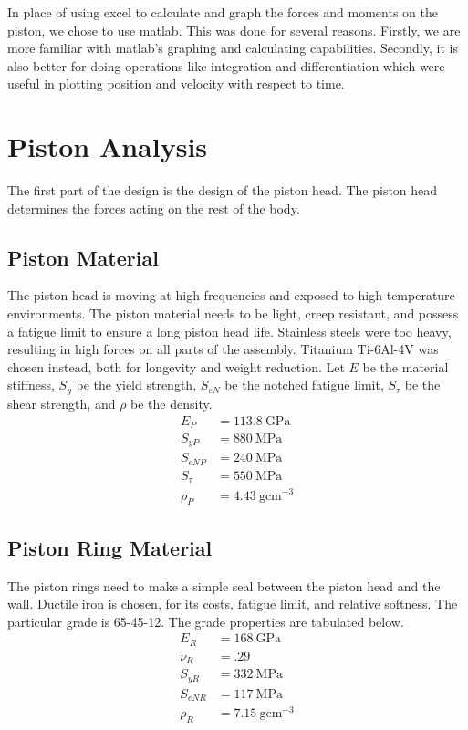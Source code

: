 \documentclass[10pt,a4paper]{article}
\begin{document}
In place of using excel to calculate and graph the forces and moments on the piston, we chose to use matlab. This was done for
several reasons. Firstly, we are more familiar with matlab's graphing and calculating capabilities. Secondly, it is also better for doing
operations like integration and differentiation which were useful in plotting position and velocity with respect to time.

\section*{Piston Analysis}
The first part of the design is the design of the piston head. The piston head determines the forces acting on the rest of the body.
\subsection*{Piston Material}
The piston head is moving at high frequencies and exposed to high-temperature environments. The piston material needs to be light, creep resistant, and possess a fatigue limit to ensure a long piston head life. Stainless steels were too heavy, resulting in high forces on all parts of the assembly. Titanium Ti-6Al-4V was chosen instead, both for longevity and weight reduction. Let $E$ be the material stiffness, $S_y$ be the yield strength, $S_{eN}$ be the notched fatigue limit, $S_{\tau}$ be the shear strength, and $\rho$ be the density. 
\begin{align*}
	E_P &= 113.8\ \text{GPa}\nonumber \\
	S_{y P} &= 880\ \text{MPa}\nonumber \\
	S_{eN P} &= 240\ \text{MPa}\nonumber \\
	S_{\tau} &= 550\ \text{MPa}\nonumber \\
	\rho_P &= 4.43\ \text{g}\text{cm}^{-3}\nonumber 
\end{align*}
\subsection*{Piston Ring Material}
The piston rings need to make a simple seal between the piston head and the wall. Ductile iron is chosen, for its costs, fatigue limit, and relative softness. The particular grade is 65-45-12. The grade properties are tabulated below.
\begin{align*}
	E_R &= 168\ \text{GPa}\nonumber \\
	\nu_R &= .29\nonumber \\
	S_{y R} &= 332\ \text{MPa}\nonumber \\
	S_{eN R}&= 117\ \text{MPa}\nonumber \\ 
	\rho_R &= 7.15\ \text{g}\text{cm}^{-3}\nonumber 
\end{align*}
\end{document}
